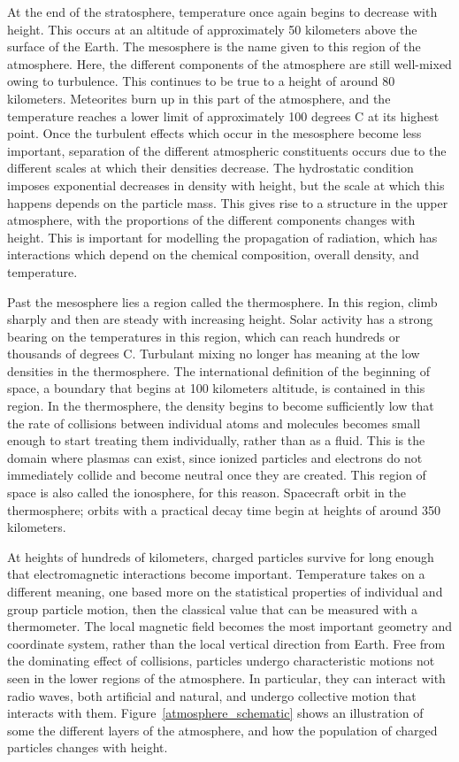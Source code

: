 At the end of the stratosphere, temperature once again begins to decrease with height. This occurs at an altitude of approximately 50 kilometers above the surface of the Earth. The mesosphere is the name given to this region of the atmosphere. Here, the different components of the atmosphere are still well-mixed owing to turbulence. This continues to be true to a height of around 80 kilometers. Meteorites burn up in this part of the atmosphere, and the temperature reaches a lower limit of approximately 100 degrees C at its highest point. Once the turbulent effects which occur in the mesosphere become less important, separation of the different atmospheric constituents occurs due to the different scales at which their densities decrease. The hydrostatic condition imposes exponential decreases in density with height, but the scale at which this happens depends on the particle mass. This gives rise to a structure in the upper atmosphere, with the proportions of the different components changes with height. This is important for modelling the propagation of  radiation, which has interactions which depend on the chemical composition, overall density, and temperature. 

Past the mesosphere lies a region called the thermosphere. In this region, climb sharply and then are steady with increasing height. Solar activity has a strong bearing on the temperatures in this region, which can reach hundreds or thousands of degrees C. Turbulant mixing no longer has meaning at the low densities in the thermosphere. The international definition of the beginning of space, a boundary that begins at 100 kilometers altitude, is contained in this region. In the thermosphere, the density begins to become sufficiently low that the rate of collisions between individual atoms and molecules becomes small enough to start treating them individually, rather than as a fluid. This is the domain where plasmas can exist, since ionized particles and electrons do not immediately collide and become neutral once they are created. This region of space is also called the ionosphere, for this reason.  Spacecraft orbit in the thermosphere; orbits with a practical decay time begin at heights of around 350 kilometers.

At heights of hundreds of kilometers, charged particles survive for long enough that electromagnetic interactions become important. Temperature takes on a different meaning, one based more on the statistical properties of individual and group particle motion, then the classical value that can be measured with a thermometer. The local magnetic field becomes the most important geometry and coordinate system, rather than the local vertical direction from Earth. Free from the dominating effect of collisions, particles undergo characteristic motions not seen in the lower regions of the atmosphere. In particular, they can interact with radio waves, both artificial and natural, and undergo collective motion that interacts with them. Figure~\ref{atmosphere_schematic} shows an illustration of some the different layers of the atmosphere, and how the population of charged particles changes with height.

